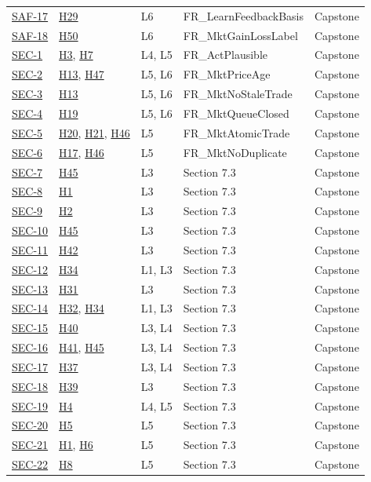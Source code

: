 \documentclass{article}
\newcommand{\reqref}[1]{\hyperref[req:#1]{#1}}
\newcommand{\hazref}[1]{\hyperref[#1]{#1}}
\begin{document}
{\begin{longtable}{>{\raggedright\arraybackslash}p{}>{\raggedright\arraybackslash}p{}>{\raggedright\arraybackslash}p{}>{\raggedright\arraybackslash}p{}l}
\reqref{SAF-17} & \hazref{H29} & L6 & FR\_LearnFeedbackBasis & Capstone\\
\reqref{SAF-18} & \hazref{H50} & L6 & FR\_MktGainLossLabel & Capstone\\
\reqref{SEC-1} & \hazref{H3}, \hazref{H7} & L4, L5 & FR\_ActPlausible & Capstone\\
\reqref{SEC-2} & \hazref{H13}, \hazref{H47} & L5, L6 & FR\_MktPriceAge & Capstone\\
\reqref{SEC-3} & \hazref{H13} & L5, L6 & FR\_MktNoStaleTrade & Capstone\\
\reqref{SEC-4} & \hazref{H19} & L5, L6 & FR\_MktQueueClosed & Capstone\\
\reqref{SEC-5} & \hazref{H20}, \hazref{H21}, \hazref{H46} & L5 & FR\_MktAtomicTrade & Capstone\\
\reqref{SEC-6} & \hazref{H17}, \hazref{H46} & L5 & FR\_MktNoDuplicate & Capstone\\
\reqref{SEC-7} & \hazref{H45} & L3 & Section 7.3 & Capstone\\
\reqref{SEC-8} & \hazref{H1} & L3 & Section 7.3 & Capstone\\
\reqref{SEC-9} & \hazref{H2} & L3 & Section 7.3 & Capstone\\
\reqref{SEC-10} & \hazref{H45} & L3 & Section 7.3 & Capstone\\
\reqref{SEC-11} & \hazref{H42} & L3 & Section 7.3 & Capstone\\
\reqref{SEC-12} & \hazref{H34} & L1, L3 & Section 7.3 & Capstone\\
\reqref{SEC-13} & \hazref{H31} & L3 & Section 7.3 & Capstone\\
\reqref{SEC-14} & \hazref{H32}, \hazref{H34} & L1, L3 & Section 7.3 & Capstone\\
\reqref{SEC-15} & \hazref{H40} & L3, L4 & Section 7.3 & Capstone\\
\reqref{SEC-16} & \hazref{H41}, \hazref{H45} & L3, L4 & Section 7.3 & Capstone\\
\reqref{SEC-17} & \hazref{H37} & L3, L4 & Section 7.3 & Capstone\\
\reqref{SEC-18} & \hazref{H39} & L3 & Section 7.3 & Capstone\\
\reqref{SEC-19} & \hazref{H4} & L4, L5 & Section 7.3 & Capstone\\
\reqref{SEC-20} & \hazref{H5} & L5 & Section 7.3 & Capstone\\
\reqref{SEC-21} & \hazref{H1}, \hazref{H6} & L5 & Section 7.3 & Capstone\\
\reqref{SEC-22} & \hazref{H8} & L5 & Section 7.3 & Capstone\\

\end{longtable}}
\end{document}
